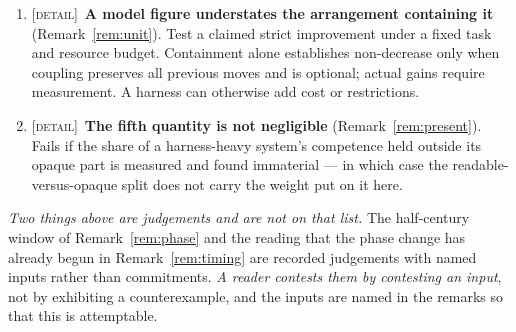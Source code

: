 \documentclass[11pt,a4paper]{article}
\theoremstyle{remark}
\begin{document}
\begin{enumerate}[leftmargin=*]
\item \textsc{[detail]}~\textbf{A model figure understates the arrangement containing it}
(Remark~\ref{rem:unit}). Test a claimed strict improvement under a fixed task
and resource budget. Containment alone establishes non-decrease only when
coupling preserves all previous moves and is optional; actual gains require
measurement. A harness can otherwise add cost or restrictions.
\item \textsc{[detail]}~\textbf{The fifth quantity is not negligible} (Remark~\ref{rem:present}). Fails
if the share of a harness-heavy system's competence held outside its opaque part is measured and found
immaterial --- in which case the readable-versus-opaque split does not carry the weight put on it
here.
\end{enumerate}

\noindent\emph{Two things above are judgements and are not on that list.} The half-century window of
Remark~\ref{rem:phase} and the reading that the phase change has already begun in
Remark~\ref{rem:timing} are recorded judgements with named inputs rather than commitments. \emph{A
reader contests them by contesting an input}, not by exhibiting a counterexample, and the inputs are
named in the remarks so that this is attemptable.
\end{document}

